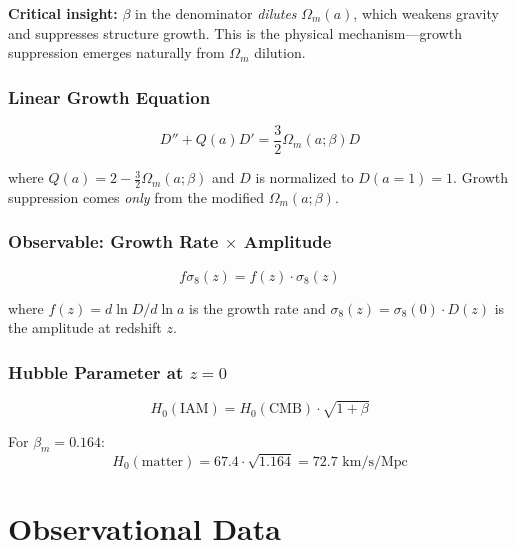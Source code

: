 \documentclass[11pt,letterpaper]{article}
\begin{document}
\noindent\textbf{Critical insight:} $\beta$ in the denominator \textit{dilutes} $\Omega_m(a)$, which weakens gravity and suppresses structure growth. This is the physical mechanism—growth suppression emerges naturally from $\Omega_m$ dilution.

\subsubsection{Linear Growth Equation}

\begin{equation}
D'' + Q(a) D' = \frac{3}{2} \Omega_m(a; \beta) D
\end{equation}

where $Q(a) = 2 - \frac{3}{2}\Omega_m(a; \beta)$ and $D$ is normalized to $D(a=1) = 1$. Growth suppression comes \textit{only} from the modified $\Omega_m(a; \beta)$.

\subsubsection{Observable: Growth Rate $\times$ Amplitude}

\begin{equation}
f\sigma_8(z) = f(z) \cdot \sigma_8(z)
\end{equation}

where $f(z) = d \ln D / d \ln a$ is the growth rate and $\sigma_8(z) = \sigma_8(0) \cdot D(z)$ is the amplitude at redshift $z$.

\subsubsection{Hubble Parameter at $z=0$}

\begin{equation}
H_0(\text{IAM}) = H_0(\text{CMB}) \cdot \sqrt{1 + \beta}
\end{equation}

For $\beta_m = 0.164$:
\begin{equation}
H_0(\text{matter}) = 67.4 \cdot \sqrt{1.164} = 72.7 \text{ km/s/Mpc}
\end{equation}

\section{Observational Data}
\end{document}
